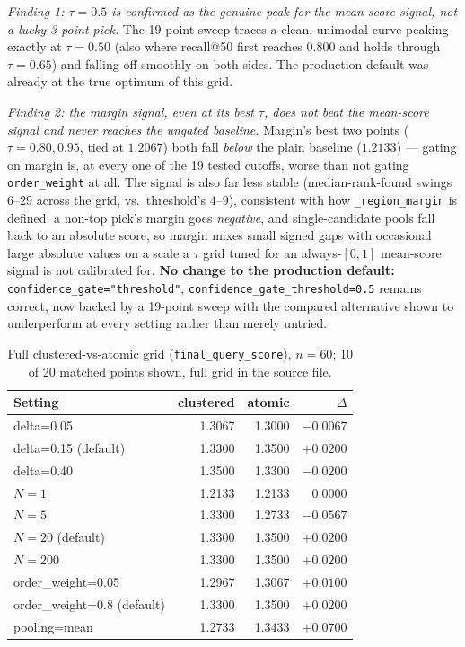 \documentclass[11pt]{article}
\newcommand{\code}[1]{\texttt{\small #1}}
\begin{document}
\emph{Finding 1: $\tau=0.5$ is confirmed as the genuine peak for the mean-score signal, not a lucky
3-point pick.} The 19-point sweep traces a clean, unimodal curve peaking exactly at $\tau=0.50$
(also where recall@50 first reaches 0.800 and holds through $\tau=0.65$) and falling off smoothly on
both sides. The production default was already at the true optimum of this grid.

\emph{Finding 2: the margin signal, even at its best $\tau$, does not beat the mean-score signal and
never reaches the ungated baseline.} Margin's best two points ($\tau=0.80,0.95$, tied at $1.2067$)
both fall \emph{below} the plain baseline ($1.2133$) --- gating on margin is, at every one of the 19
tested cutoffs, worse than not gating \code{order\_weight} at all. The signal is also far less
stable (median-rank-found swings $6$--$29$ across the grid, vs.\ threshold's $4$--$9$), consistent
with how \code{\_region\_margin} is defined: a non-top pick's margin goes \emph{negative}, and
single-candidate pools fall back to an absolute score, so margin mixes small signed gaps with
occasional large absolute values on a scale a $\tau$ grid tuned for an always-$[0,1]$ mean-score
signal is not calibrated for. \textbf{No change to the production default:}
\code{confidence\_gate="threshold"}, \code{confidence\_gate\_threshold=0.5} remains correct, now
backed by a 19-point sweep with the compared alternative shown to underperform at every setting
rather than merely untried.

\begin{table}[h]
\centering\small
\begin{tabular}{@{}lrrr@{}}
\toprule
Setting & clustered & atomic & $\Delta$ \\
\midrule
delta=0.05 & 1.3067 & 1.3000 & $-0.0067$ \\
delta=0.15 (default) & 1.3300 & 1.3500 & $+0.0200$ \\
delta=0.40 & 1.3500 & 1.3300 & $-0.0200$ \\
$N=1$ & 1.2133 & 1.2133 & $0.0000$ \\
$N=5$ & 1.3300 & 1.2733 & $-0.0567$ \\
$N=20$ (default) & 1.3300 & 1.3500 & $+0.0200$ \\
$N=200$ & 1.3300 & 1.3500 & $+0.0200$ \\
order\_weight=0.05 & 1.2967 & 1.3067 & $+0.0100$ \\
order\_weight=0.8 (default) & 1.3300 & 1.3500 & $+0.0200$ \\
pooling=mean & 1.2733 & 1.3433 & $+0.0700$ \\
\bottomrule
\end{tabular}
\caption{Full clustered-vs-atomic grid (\code{final\_query\_score}), $n=60$; 10 of 20 matched
points shown, full grid in the source file.}
\label{tab:tuple-atomic-grid}
\end{table}
\end{document}
